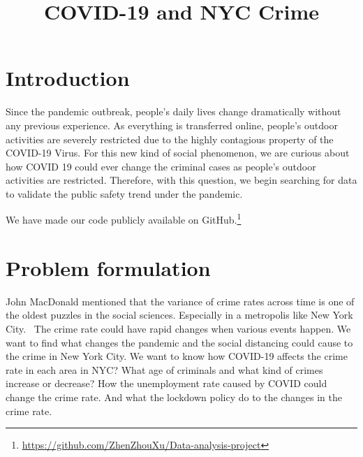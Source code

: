 \documentclass[conference]{IEEEtran}
\begin{document}
\title{COVID-19 and NYC Crime}

\author{
\and
{}
\and
{}
}

\maketitle


\section{Introduction}
Since the pandemic outbreak, people's daily lives change dramatically without any previous experience. As everything is transferred online, people's outdoor activities are severely restricted due to the highly contagious property of the COVID-19 Virus. For this new kind of social phenomenon, we are curious about how COVID 19 could ever change the criminal cases as people's outdoor activities are restricted. Therefore, with this question, we begin searching for data to validate the public safety trend under the pandemic.

We have made our code publicly available on GitHub.\footnote{\url{https://github.com/ZhenZhouXu/Data-analysis-project}}


\section{Problem formulation}
John MacDonald mentioned that the variance of crime rates across time is one of the oldest puzzles in the social sciences. Especially in a metropolis like New York City.~\cite{mac2020TheEffe} The crime rate could have rapid changes when various events happen. We want to find what changes the pandemic and the social distancing could cause to the crime in New York City. We want to know how COVID-19 affects the crime rate in each area in NYC? What age of criminals and what kind of crimes increase or decrease? How the unemployment rate caused by COVID could change the crime rate. And what the lockdown policy do to the changes in the crime rate.
\end{document}
